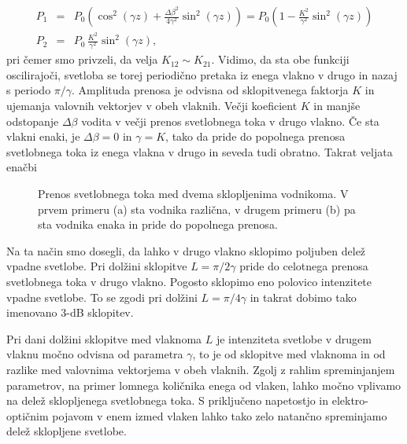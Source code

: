 \begin{eqnarray}
P_1 &=& P_0 \left( \cos^2(\gamma z) + \frac{\Delta \beta^2}{4 \gamma^2}\sin^2(\gamma z) \right)
= P_0 \left( 1 - \frac{K^2}{\gamma^2}\sin^2(\gamma z) \right)\\
P_2 &= & P_0\, \frac{K^2}{\gamma^2}\sin^2(\gamma z),
\end{eqnarray}
pri čemer smo privzeli, da velja $K_{12} \sim K_{21}$. Vidimo, da sta obe funkciji oscilirajoči, 
svetloba se torej periodično pretaka iz enega vlakno v drugo in nazaj s periodo $\pi/\gamma$. 
Amplituda prenosa je 
odvisna od sklopitvenega faktorja $K$ in ujemanja valovnih vektorjev v obeh vlaknih. Večji koeficient $K$
in manjše odstopanje $\Delta \beta$ vodita v večji prenos svetlobnega toka v drugo vlakno. Če sta vlakni 
enaki, je $\Delta \beta = 0$ in $\gamma = K$, tako da pride do popolnega prenosa
svetlobnega toka iz enega vlakna v drugo in seveda tudi obratno.
Takrat veljata enačbi
\begin{figure}[h]
\centering
\def\svgwidth{140truemm} 
 
\caption{Prenos svetlobnega toka med dvema sklopljenima vodnikoma. V prvem primeru (a) sta
vodnika različna, v drugem primeru (b) pa sta vodnika enaka in pride do popolnega prenosa.}
\label{fig:foscil}
\end{figure}
Na ta način smo dosegli, da lahko v drugo vlakno sklopimo poljuben delež vpadne svetlobe. 
Pri dolžini sklopitve $L = \pi/2 \gamma$ pride do celotnega prenosa svetlobnega toka v drugo vlakno.
Pogosto sklopimo eno polovico intenzitete vpadne svetlobe. To se zgodi pri dolžini $L = \pi/4 \gamma$
in takrat dobimo tako imenovano 3-dB sklopitev. 

\begin{remark}
 Pri dani dolžini sklopitve med vlaknoma $L$ je intenziteta svetlobe v drugem vlaknu močno odvisna od
 parametra $\gamma$, to je od sklopitve med vlaknoma in od razlike med valovnima vektorjema 
 v obeh vlaknih. Zgolj z rahlim spreminjanjem parametrov, na primer lomnega količnika enega od vlaken,
 lahko močno vplivamo na delež sklopljenega svetlobnega toka. S priključeno napetostjo in elektro-optičnim
 pojavom v enem izmed vlaken lahko tako zelo natančno spreminjamo delež sklopljene svetlobe. 
\end{remark}






